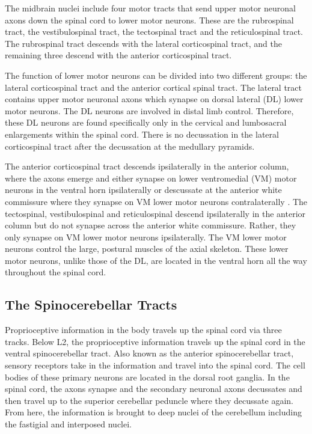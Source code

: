 The midbrain nuclei include four motor tracts that send upper motor neuronal axons down the spinal cord to lower motor neurons. These are the rubrospinal tract, the vestibulospinal tract, the tectospinal tract and the reticulospinal tract. The rubrospinal tract descends with the lateral corticospinal tract, and the remaining three descend with the anterior corticospinal tract.

The function of lower motor neurons can be divided into two different groups: the lateral corticospinal tract and the anterior cortical spinal tract. The lateral tract contains upper motor neuronal axons which synapse on dorsal lateral (DL) lower motor neurons. The DL neurons are involved in distal limb control. Therefore, these DL neurons are found specifically only in the cervical and lumbosacral enlargements within the spinal cord. There is no decussation in the lateral corticospinal tract after the decussation at the medullary pyramids.

The anterior corticospinal tract descends ipsilaterally in the anterior column, where the axons emerge and either synapse on lower ventromedial (VM) motor neurons in the ventral horn ipsilaterally or descussate at the anterior white commissure where they synapse on VM lower motor neurons contralaterally . The tectospinal, vestibulospinal and reticulospinal descend ipsilaterally in the anterior column but do not synapse across the anterior white commissure. Rather, they only synapse on VM lower motor neurons ipsilaterally. The VM lower motor neurons control the large, postural muscles of the axial skeleton. These lower motor neurons, unlike those of the DL, are located in the ventral horn all the way throughout the spinal cord.

\hypertarget{the-spinocerebellar-tracts}{%
\subsection{The Spinocerebellar Tracts}\label{the-spinocerebellar-tracts}}

Proprioceptive information in the body travels up the spinal cord via three tracks. Below L2, the proprioceptive information travels up the spinal cord in the ventral spinocerebellar tract. Also known as the anterior spinocerebellar tract, sensory receptors take in the information and travel into the spinal cord. The cell bodies of these primary neurons are located in the dorsal root ganglia. In the spinal cord, the axons synapse and the secondary neuronal axons decussates and then travel up to the superior cerebellar peduncle where they decussate again. From here, the information is brought to deep nuclei of the cerebellum including the fastigial and interposed nuclei.

